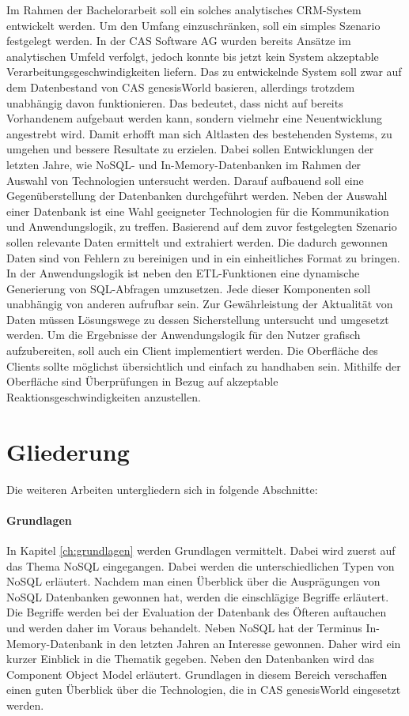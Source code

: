 Im Rahmen der Bachelorarbeit soll ein solches analytisches CRM-System entwickelt werden. Um den Umfang einzuschränken, soll ein simples Szenario festgelegt werden. In der CAS Software AG wurden bereits Ansätze im analytischen Umfeld verfolgt, jedoch konnte bis jetzt kein System akzeptable Verarbeitungsgeschwindigkeiten liefern. Das zu entwickelnde System soll zwar auf dem Datenbestand von CAS genesisWorld basieren, allerdings trotzdem unabhängig davon funktionieren. Das bedeutet, dass nicht auf bereits Vorhandenem aufgebaut werden kann, sondern vielmehr eine Neuentwicklung angestrebt wird. Damit erhofft man sich Altlasten des bestehenden Systems, zu umgehen und bessere Resultate zu erzielen. Dabei sollen Entwicklungen der letzten Jahre, wie NoSQL- und In-Memory-Datenbanken im Rahmen der Auswahl von Technologien untersucht werden. Darauf aufbauend soll eine Gegenüberstellung der Datenbanken durchgeführt werden. Neben der Auswahl einer Datenbank ist eine Wahl geeigneter Technologien für die Kommunikation und Anwendungslogik, zu treffen. Basierend auf dem zuvor festgelegten Szenario sollen relevante Daten ermittelt und extrahiert werden. Die dadurch gewonnen Daten sind von Fehlern zu bereinigen und in ein einheitliches Format zu bringen.
In der Anwendungslogik ist neben den ETL-Funktionen eine dynamische Generierung von SQL-Abfragen umzusetzen. Jede dieser Komponenten soll unabhängig von anderen aufrufbar sein. Zur Gewährleistung der Aktualität von Daten müssen Lösungswege zu dessen Sicherstellung untersucht und umgesetzt werden. Um die Ergebnisse der Anwendungslogik für den Nutzer grafisch aufzubereiten, soll auch ein Client implementiert werden. Die Oberfläche des Clients sollte möglichst übersichtlich und einfach zu handhaben sein. Mithilfe der Oberfläche sind Überprüfungen in Bezug auf akzeptable Reaktionsgeschwindigkeiten anzustellen. 

\section{Gliederung}
\label{ch:Einfuehrung:sec:Gliederung}

Die weiteren Arbeiten untergliedern sich in folgende Abschnitte: 
 
\paragraph{Grundlagen} In Kapitel \ref{ch:grundlagen} werden Grundlagen vermittelt. Dabei wird zuerst auf das Thema NoSQL eingegangen. Dabei werden die unterschiedlichen Typen von NoSQL erläutert. Nachdem man einen Überblick über die Ausprägungen von NoSQL Datenbanken gewonnen hat, werden die einschlägige Begriffe erläutert. Die Begriffe werden bei der Evaluation der Datenbank des Öfteren auftauchen und werden daher im Voraus behandelt. Neben NoSQL hat der Terminus In-Memory-Datenbank in den letzten Jahren an Interesse gewonnen. Daher wird ein kurzer Einblick in die Thematik gegeben. Neben den Datenbanken wird das Component Object Model erläutert. Grundlagen in diesem Bereich verschaffen einen guten Überblick über die Technologien, die in CAS genesisWorld eingesetzt werden. 

